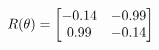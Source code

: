 \documentclass[preview]{standalone}
\begin{document}
\begin{align*}
\special{dvisvgm:raw <g id='unique000'>}R(\theta) = \begin{bmatrix}-0.14 & -0.99\\0.99 & -0.14\end{bmatrix}\special{dvisvgm:raw </g>}
\end{align*}
\end{document}
